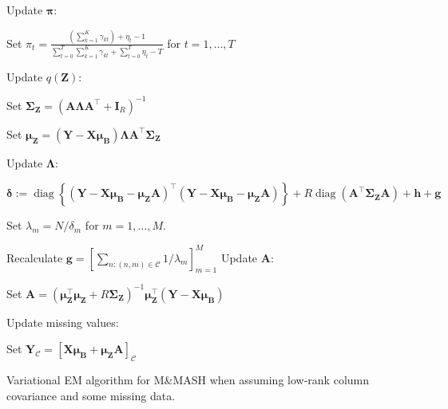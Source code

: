 \documentclass[11pt,authoryear]{article}
\DeclareMathOperator*{\diag}{diag}
\newcommand{\bs}[1]{\boldsymbol{#1}}
\begin{document}
\begin{algorithm}
\begin{algorithmic}
  \STATE Update $\bs{\pi}$:
  \begin{description}
  \item Set $\pi_t = \frac{\left(\sum_{k = 1}^K\gamma_{kt}\right) + \eta_t - 1}{\sum_{t = 0}^T\sum_{k = 1}^K\gamma_{kt} + \sum_{t = 0}^T\eta_t - T}$ for $t = 1,\ldots, T$
  \end{description}
  \STATE Update $q(\bs{Z})$:
  \begin{description}
  \item Set $\bs{\Sigma}_{\bs{Z}} = \left(\bs{A}\bs{\Lambda}\bs{A}^{\intercal} + \bs{I}_R\right)^{-1}$
  \item Set $\bs{\mu}_{\bs{Z}} = (\bs{Y}-\bs{X}\bs{\mu}_{\bs{B}})\bs{\Lambda} \bs{A}^{\intercal}\bs{\Sigma}_{\bs{Z}}$
  \end{description}
  \STATE Update $\bs{\Lambda}$:
  \begin{description}
  \item $\bs{\delta} := \diag\left\{(\bs{Y}-\bs{X}\bs{\mu}_{\bs{B}} - \bs{\mu}_{\bs{Z}}\bs{A})^{\intercal}(\bs{Y}-\bs{X}\bs{\mu}_{\bs{B}} - \bs{\mu}_{\bs{Z}}\bs{A})\right\} + R\diag(\bs{A}^{\intercal}\bs{\Sigma}_{\bs{Z}}\bs{A}) + \bs{h} + \bs{g}$
  \item Set $\lambda_m = N / \delta_m$ for $m = 1,\ldots,M$.
  \end{description}
  \STATE Recalculate $\bs{g} = \left[\sum_{n: (n, m) \in \mathcal{C}} 1 / \lambda_m\right]_{m = 1}^M$
  \STATE Update $\bs{A}$:
  \begin{description}
  \item Set $\bs{A} = \left(\bs{\mu}_{\bs{Z}}^{\intercal}\bs{\mu}_{\bs{Z}} + R\bs{\Sigma}_{\bs{Z}}\right)^{-1} \bs{\mu}_{\bs{Z}}^{\intercal}(\bs{Y} - \bs{X}\bs{\mu}_{\bs{B}})$
  \end{description}
  \STATE Update missing values:
  \begin{description}
  \item Set $\bs{Y}_{\mathcal{C}} = \left[\bs{X}\bs{\mu}_{\bs{B}} + \bs{\mu}_{\bs{Z}}\bs{A}\right]_{\mathcal{C}}$
  \end{description}
\end{algorithmic}
\caption{Variational EM algorithm for M\&MASH when assuming low-rank column covariance and some missing data.}
\label{algorithm:vem.missing}
\end{algorithm}
\end{document}
